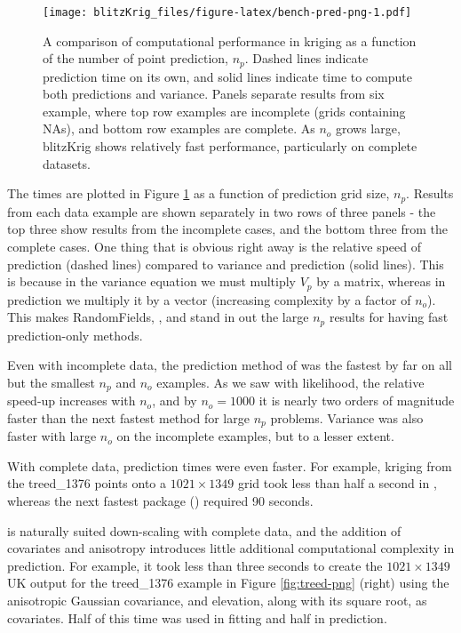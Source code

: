 \begin{figure}
\centering
\texttt{[image: blitzKrig\_files/figure-latex/bench-pred-png-1.pdf]}
\caption{\label{fig:bench-pred-png}A comparison of computational performance in kriging as a function of the number of point prediction, \(n_p\). Dashed lines indicate prediction time on its own, and solid lines indicate time to compute both predictions and variance. Panels separate results from six example, where top row examples are incomplete (grids containing NAs), and bottom row examples are complete. As \(n_o\) grows large, blitzKrig shows relatively fast performance, particularly on complete datasets.}
\end{figure}

The times are plotted in Figure \ref{fig:bench-pred-png} as a function of prediction grid size, \(n_p\). Results from each data example are shown separately in two rows of three panels - the top three show results from the incomplete cases, and the bottom three from the complete cases. One thing that is obvious right away is the relative speed of prediction (dashed lines) compared to variance and prediction (solid lines). This is because in the variance equation we must multiply \(V_p\) by a matrix, whereas in prediction we multiply it by a vector (increasing complexity by a factor of \(n_o\)). This makes RandomFields, , and  stand in out the large \(n_p\) results for having fast prediction-only methods.

Even with incomplete data, the prediction method of  was the fastest by far on all but the smallest \(n_p\) and \(n_o\) examples. As we saw with likelihood, the relative speed-up increases with \(n_o\), and by \(n_o=1000\) it is nearly two orders of magnitude faster than the next fastest method for large \(n_p\) problems. Variance was also faster with large \(n_o\) on the incomplete examples, but to a lesser extent.

With complete data, prediction times were even faster. For example, kriging from the treed\_1376 points onto a \(1021 \times 1349\) grid took less than half a second in , whereas the next fastest package () required 90 seconds.

 is naturally suited down-scaling with complete data, and the addition of covariates and anisotropy introduces little additional computational complexity in prediction. For example, it took less than three seconds to create the \(1021 \times 1349\) UK output for the treed\_1376 example in Figure \ref{fig:treed-png} (right) using the anisotropic Gaussian covariance, and elevation, along with its square root, as covariates. Half of this time was used in fitting and half in prediction.

